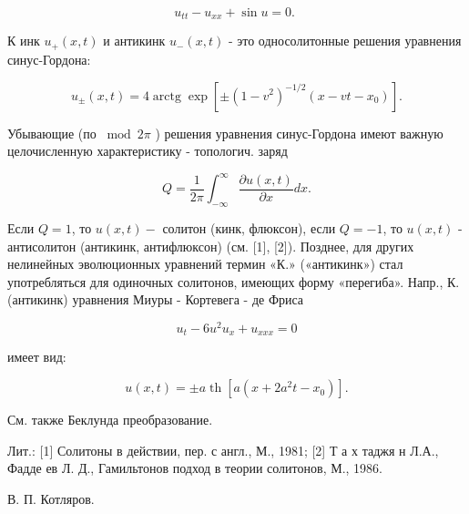 \documentclass[10pt]{article}
\begin{document}
\[

u_{t t}-u_{x x}+\sin u=0 \text {. }

\]



К инк $u_{+}(x, t)$ и антикинк $u_{-}(x, t)$ - это односолитонные решения уравнения синус-Гордона:



\[

u_{ \pm}(x, t)=4 \operatorname{arctg} \exp \left[ \pm\left(1-v^{2}\right)^{-1 / 2}\left(x-v t-x_{0}\right)\right] .

\]



Убывающие (по $\bmod 2 \pi$ ) решения уравнения синус-Гордона имеют важную целочисленную характеристику - топологич. заряд



\[

Q=\frac{1}{2 \pi} \int_{-\infty}^{\infty} \frac{\partial u(x, t)}{\partial x} d x .

\]



Если $Q=1$, то $u(x, t)-$ солитон (кинк, флюксон), если $Q=-1$, то $u(x, t)$ - антисолитон (антикинк, антифлюксон) (см. [1], [2]). Позднее, для других нелинейных эволюционных уравнений термин «К.» («антикинк») стал употребляться для одиночных солитонов, имеющих форму «перегиба». Напр., К. (антикинк) уравнения Миуры - Кортевега - де Фриса



\[

u_{t}-6 u^{2} u_{x}+u_{x x x}=0

\]



имеет вид:



\[

u(x, t)= \pm a \operatorname{th}\left[a\left(x+2 a^{2} t-x_{0}\right)\right] .

\]



См. также Беклунда преобразование.



Лит.: [1] Солитоны в действии, пер. с англ., М., 1981; [2] Т а х таджя н Л.А., Фадде ев Л. Д., Гамильтонов подход в теории солитонов, М., 1986.



В. П. Котляров.
\end{document}
